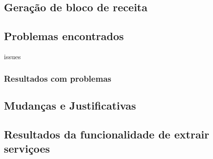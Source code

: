 \subsection{Geração de bloco de receita}

\subsection{Problemas encontrados}

issues

\subsubsection{Resultados com problemas}

\subsection{Mudanças e Justificativas}

\subsection{Resultados da funcionalidade de extrair serviçoes}
